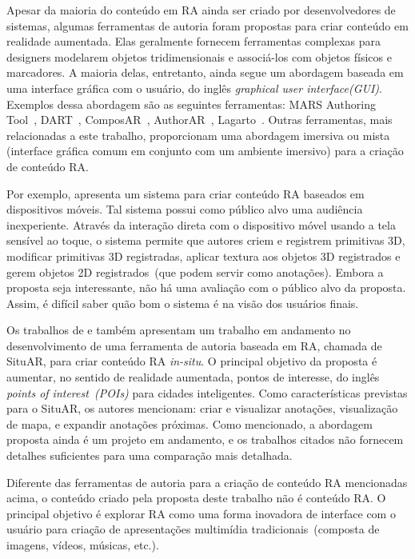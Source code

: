 \documentclass[../main.tex]{subfiles}
\begin{document}
Apesar da maioria do conteúdo em RA ainda ser criado por desenvolvedores de sistemas, algumas ferramentas de autoria foram propostas para criar conteúdo em realidade aumentada. Elas geralmente fornecem ferramentas complexas para designers modelarem objetos tridimensionais e associá-los com objetos físicos e marcadores. A maioria delas, entretanto, ainda segue um abordagem baseada em uma interface gráfica com o usuário, do inglês \emph{graphical user interface(GUI)}. Exemplos dessa abordagem são as seguintes ferramentas: MARS Authoring Tool~\cite{sinem_authoring_2003}, DART~\cite{macintyre_dart_2004}, ComposAR~\cite{seichter_composar_2008}, AuthorAR~\cite{lucrecia_authorar_2013}, Lagarto~\cite{maia_lagarto_2017}. Outras ferramentas, mais relacionadas a este trabalho, proporcionam uma abordagem imersiva ou mista (interface gráfica comum em conjunto com um ambiente imersivo) para a criação de conteúdo RA.

Por exemplo,  apresenta um sistema para criar conteúdo RA baseados em dispositivos móveis. Tal sistema possui como público alvo uma audiência inexperiente. Através da interação direta com o dispositivo móvel usando a tela sensível ao toque, o sistema permite que autores criem e registrem primitivas 3D, modificar primitivas 3D registradas, aplicar textura aos objetos 3D registrados e gerem objetos 2D registrados~(que podem servir como anotações). Embora a proposta seja interessante, não há uma avaliação com o público alvo da proposta. Assim, é difícil saber quão bom o sistema é na visão dos usuários finais.

Os trabalhos de  e  também apresentam um trabalho em andamento no desenvolvimento de uma ferramenta de autoria baseada em RA, chamada de SituAR, para criar conteúdo RA \emph{in-situ}. O principal objetivo da proposta é aumentar, no sentido de realidade aumentada, pontos de interesse, do inglês \emph{points of interest~(POIs)} para cidades inteligentes. Como características previstas para o SituAR, os autores mencionam: criar e visualizar anotações, visualização de mapa, e expandir anotações próximas. Como mencionado, a abordagem proposta ainda é um projeto em andamento, e os trabalhos citados não fornecem detalhes suficientes para uma comparação mais detalhada.

Diferente das ferramentas de autoria para a criação de conteúdo RA mencionadas acima, o conteúdo criado pela proposta deste trabalho não é conteúdo RA. O principal objetivo é explorar RA como uma forma inovadora de interface com o usuário para criação de apresentações multimídia tradicionais~(composta de imagens, vídeos, músicas, etc.).
\end{document}
